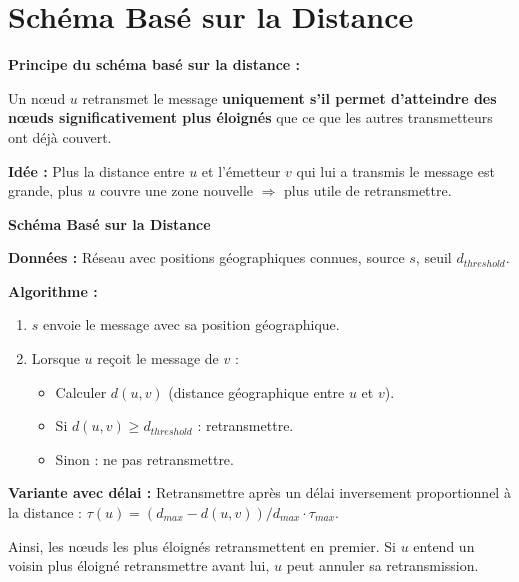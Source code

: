 \documentclass[12pt,a4paper]{article}
\begin{document}
\newpage

\section{Schéma Basé sur la Distance}

\begin{definition}
\textbf{Principe du schéma basé sur la distance :}

Un nœud $u$ retransmet le message \textbf{uniquement s'il permet d'atteindre des nœuds
significativement plus éloignés} que ce que les autres transmetteurs ont déjà couvert.

\textbf{Idée :} Plus la distance entre $u$ et l'émetteur $v$ qui lui a transmis le message est
grande, plus $u$ couvre une zone nouvelle $\Rightarrow$ plus utile de retransmettre.
\end{definition}

\begin{algorithme}
\textbf{Schéma Basé sur la Distance}

\textbf{Données :} Réseau avec positions géographiques connues, source $s$, seuil $d_{threshold}$.

\textbf{Algorithme :}
\begin{enumerate}
    \item $s$ envoie le message avec sa position géographique.
    \item Lorsque $u$ reçoit le message de $v$ :
    \begin{itemize}
        \item Calculer $d(u, v)$ (distance géographique entre $u$ et $v$).
        \item Si $d(u, v) \geq d_{threshold}$ : retransmettre.
        \item Sinon : ne pas retransmettre.
    \end{itemize}
\end{enumerate}

\textbf{Variante avec délai :} Retransmettre après un délai inversement proportionnel à la
distance : $\tau(u) = (d_{max} - d(u,v)) / d_{max} \cdot \tau_{max}$.

Ainsi, les nœuds les plus éloignés retransmettent en premier. Si $u$ entend un voisin plus
éloigné retransmettre avant lui, $u$ peut annuler sa retransmission.
\end{algorithme}
\end{document}
